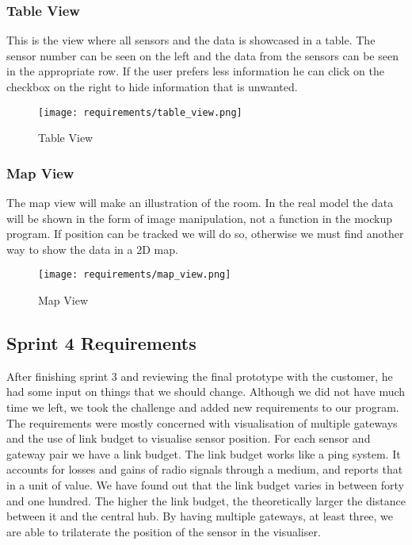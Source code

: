 \documentclass[../document]{subfiles}
\begin{document}
\newpage

\subsubsection{Table View}
This is the view where all sensors and the data is showcased in a table. The sensor number can be seen on the left and the data from the sensors can be seen in the appropriate row. If the user prefers less information he can click on the checkbox on the right to hide information that is unwanted.

\begin{figure}[H]
\centering
\texttt{[image: requirements/table\_view.png]}
\caption{Table View}
\end{figure}

\newpage

\subsubsection{Map View}
The map view will make an illustration of the room. In the real model the data will be shown in the form of image manipulation, not a function in the mockup program. If position can be tracked we will do so, otherwise we must find another way to show the data in a 2D map.

\begin{figure}[H]
\centering
\texttt{[image: requirements/map\_view.png]}
\caption{Map View}
\end{figure}

\subsection{Sprint 4 Requirements}
\label{requirements_sprint_4}
After finishing sprint 3 and reviewing the final prototype with the customer, he had some input on things that we should change. Although we did not have much time we left, we took the challenge and added new requirements to our program. The requirements were mostly concerned with visualisation of multiple gateways and the use of link budget to visualise sensor position. For each sensor and gateway pair we have a link budget. The link budget works like a ping system. It accounts for losses and gains of radio signals through a medium, and reports that in a unit of value. We have found out that the link budget varies in between forty and one hundred. The higher the link budget, the theoretically larger the distance between it and the central hub. By having multiple gateways, at least three, we are able to trilaterate the position of the sensor in the visualiser.
\end{document}
